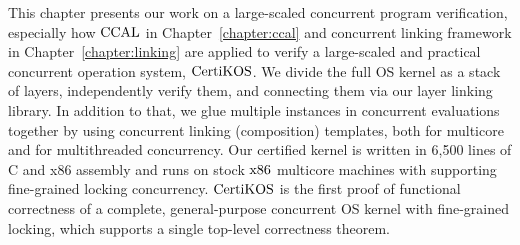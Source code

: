 

This chapter presents our work on a large-scaled concurrent program verification, 
especially 
how $\mathrm{CCAL}$ in Chapter~\ref{chapter:ccal} and concurrent linking framework in Chapter~\ref{chapter:linking} are applied 
to verify a large-scaled and practical concurrent operation system, $\mathrm{CertiKOS}$.
We divide the full OS kernel as a stack of layers, independently verify them, 
and connecting them via our layer linking library. 
In addition to that, 
we glue multiple instances in concurrent evaluations together by using concurrent linking (composition) templates, both for multicore and for multithreaded concurrency.  
Our certified kernel is written in 6,500 lines of C and x86 assembly
and runs on stock $\mathrm{x86}$ multicore machines with supporting fine-grained locking concurrency. 
$\mathrm{CertiKOS}$ is the first proof of functional correctness of a complete,
general-purpose concurrent OS kernel with fine-grained locking,
which supports a single top-level correctness theorem. 

